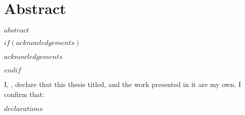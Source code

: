 \documentclass[
11pt, %
oneside, %
english, %
singlespacing, %
]{macthesis} %
\def\blankpage{%
      \clearpage%
      \thispagestyle{empty}%
      \addtocounter{page}{-1}%
      \null%
      \clearpage}
\begin{document}

\section*{\Huge Abstract}
\addchaptertocentry{\abstractname}
$abstract$
\blankpage
\clearpage


$if(acknowledgements)$
  \begin{acknowledgements}
  \addchaptertocentry{\acknowledgementname} %
    $acknowledgements$
  \end{acknowledgements}
$endif$
\blankpage
\clearpage


\tableofcontents %

\listoffigures %

\listoftables %



\begin{declaration}
\addchaptertocentry{\authorshipname}

\noindent I, \authorname, declare that this thesis titled, \emph{\ttitle} and the work presented in it are my own. I confirm that:

$declarations$

\end{declaration}
\end{document}

